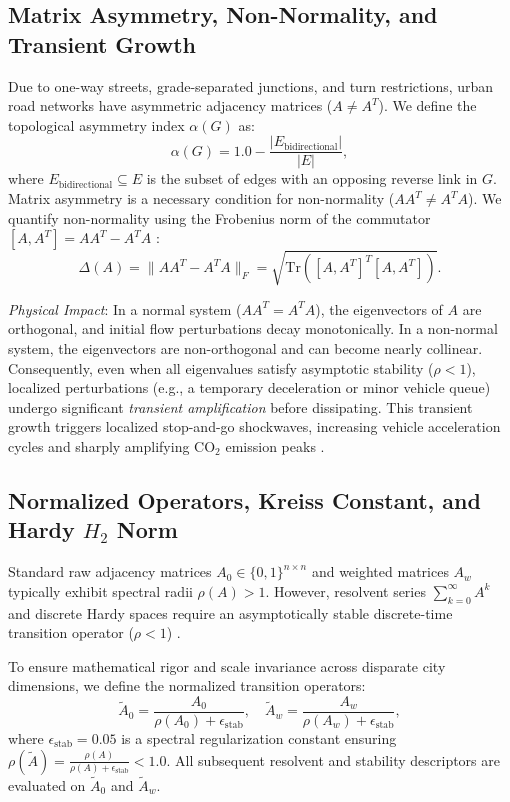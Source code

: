 \documentclass[journal]{IEEEtran}
\begin{document}
\subsection{Matrix Asymmetry, Non-Normality, and Transient Growth}
Due to one-way streets, grade-separated junctions, and turn restrictions, urban road networks have asymmetric adjacency matrices ($A \neq A^T$). We define the topological asymmetry index $\alpha(G)$ as:
\begin{equation}
\alpha(G) = 1.0 - \frac{|E_{\text{bidirectional}}|}{|E|},
\label{eq:asymmetry}
\end{equation}
where $E_{\text{bidirectional}} \subseteq E$ is the subset of edges with an opposing reverse link in $G$. Matrix asymmetry is a necessary condition for non-normality ($A A^T \neq A^T A$). We quantify non-normality using the Frobenius norm of the commutator $[A, A^T] = A A^T - A^T A$ \cite{Schur1909, Henrici1962}:
\begin{equation}
\Delta(A) = \| A A^T - A^T A \|_F = \sqrt{\text{Tr}\left( [A, A^T]^T [A, A^T] \right)}.
\label{eq:commutator}
\end{equation}

\textit{Physical Impact}: In a normal system ($A A^T = A^T A$), the eigenvectors of $A$ are orthogonal, and initial flow perturbations decay monotonically. In a non-normal system, the eigenvectors are non-orthogonal and can become nearly collinear. Consequently, even when all eigenvalues satisfy asymptotic stability ($\rho < 1$), localized perturbations (e.g., a temporary deceleration or minor vehicle queue) undergo significant \emph{transient amplification} before dissipating. This transient growth triggers localized stop-and-go shockwaves, increasing vehicle acceleration cycles and sharply amplifying $\text{CO}_2$ emission peaks \cite{Trefethen2005, Whitham2011, Kerner2009}.

\subsection{Normalized Operators, Kreiss Constant, and Hardy $H_2$ Norm}
Standard raw adjacency matrices $A_0 \in \{0, 1\}^{n \times n}$ and weighted matrices $A_w$ typically exhibit spectral radii $\rho(A) > 1$. However, resolvent series $\sum_{k=0}^\infty A^k$ and discrete Hardy spaces require an asymptotically stable discrete-time transition operator ($\rho < 1$) \cite{Kreiss1962, Zhou1996}.

To ensure mathematical rigor and scale invariance across disparate city dimensions, we define the normalized transition operators:
\begin{equation}
\tilde{A}_0 = \frac{A_0}{\rho(A_0) + \epsilon_{\text{stab}}}, \quad \tilde{A}_w = \frac{A_w}{\rho(A_w) + \epsilon_{\text{stab}}},
\label{eq:normalized_operators}
\end{equation}
where $\epsilon_{\text{stab}} = 0.05$ is a spectral regularization constant ensuring $\rho(\tilde{A}) = \frac{\rho(A)}{\rho(A) + \epsilon_{\text{stab}}} < 1.0$. All subsequent resolvent and stability descriptors are evaluated on $\tilde{A}_0$ and $\tilde{A}_w$.
\end{document}
